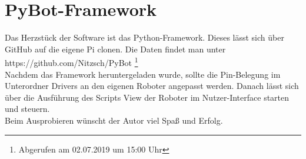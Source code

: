 \documentclass[twoside,12pt,a4paper]{report}
\begin{document}
	\section{PyBot-Framework}
	Das Herzstück der Software ist das Python-Framework. Dieses lässt sich über GitHub auf die eigene Pi clonen. Die Daten findet man unter https://github.com/Nitzsch/PyBot \footnote{Abgerufen am 02.07.2019 um 15:00 Uhr}\\
	Nachdem das Framework heruntergeladen wurde, sollte die Pin-Belegung im Unterordner Drivers an den eigenen Roboter angepasst werden. Danach lässt sich über die Ausführung des Scripts View der Roboter im Nutzer-Interface starten und steuern. \\
	Beim Ausprobieren wünscht der Autor viel Spaß und Erfolg. 
	
	\cleardoublepage
	
	
	
	
	
	
	
	
	
\end{document}

